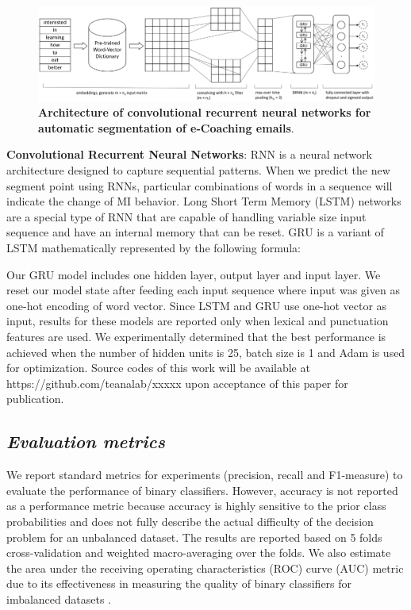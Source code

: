 \documentclass{amia}
\begin{document}
\begin{figure}[!htb]
    \centering
    \includegraphics[width=1.0\textwidth]{figures/CRNN.eps}
    \caption{\textbf{Architecture of convolutional recurrent neural networks for automatic segmentation of e-Coaching emails}.}
    \label{fig:crnn}
\end{figure}

\textbf{Convolutional Recurrent Neural Networks}: RNN is a neural network architecture designed to capture sequential patterns. When we predict the new segment point using RNNs, particular combinations of words in a sequence will indicate the change of MI behavior. Long Short Term Memory (LSTM) networks\cite{hochreiter1997long} are a special type of RNN that are capable of handling variable size input sequence and have an internal memory that can be reset. GRU\cite{chung2014empirical} is a variant of LSTM mathematically represented by the following formula:

Our GRU model includes one hidden layer, output layer and input layer. We reset our model state after feeding each input sequence where input was given as one-hot encoding of word vector. Since LSTM and GRU use one-hot vector as input, results for these models are reported only when lexical and punctuation features are used. We experimentally determined that the best performance is achieved when the number of hidden units is 25, batch size is 1 and Adam\cite{kingma2014adam} is used for optimization. Source codes of this work will be available at https://github.com/teanalab/xxxxx upon acceptance of this paper for publication.          
  
\subsection*{\textit{Evaluation metrics}}
We report standard metrics for experiments (precision, recall and F1-measure) to evaluate the performance of binary classifiers\cite{aas1999text}. However, accuracy is not reported as a performance metric because accuracy is highly sensitive to the prior class probabilities and does not fully describe the actual difficulty of the decision problem for an unbalanced dataset. The results are reported based on 5 folds cross-validation and weighted macro-averaging over the folds. We also estimate the area under the receiving operating characteristics (ROC) curve\cite{kumar2011receiver} (AUC) metric due to its effectiveness in measuring the quality of binary classifiers for imbalanced datasets \cite{hu2015kernelized}. 
\end{document}
